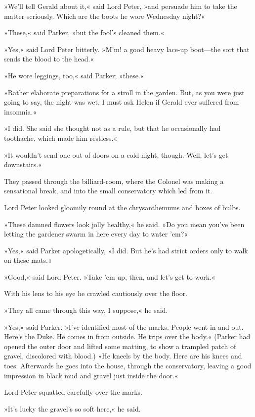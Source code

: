 »We'll tell Gerald about it,« said Lord Peter, »and persuade him to take the matter seriously. Which are the boots he wore Wednesday night?«

»These,« said Parker, »but the fool's cleaned them.«

»Yes,« said Lord Peter bitterly. »M'm! a good heavy lace-up boot\allowbreak---\allowbreak the sort that sends the blood to the head.«

»He wore leggings, too,« said Parker; »these.«

»Rather elaborate preparations for a stroll in the garden. But, as you were just going to say, the night was wet. I must ask Helen if Gerald ever suffered from insomnia.«

»I did. She said she thought not as a rule, but that he occasionally had toothache, which made him restless.«

»It wouldn't send one out of doors on a cold night, though. Well, let's get downstairs.«

They passed through the billiard-room, where the Colonel was making a sensational break, and into the small conservatory which led from it.

Lord Peter looked gloomily round at the chrysanthemums and boxes of bulbs.

»These damned flowers look jolly healthy,« he said. »Do you mean you've been letting the gardener swarm in here every day to water 'em?«

»Yes,« said Parker apologetically, »I did. But he's had strict orders only to walk on these mats.«

»Good,« said Lord Peter. »Take 'em up, then, and let's get to work.«

With his lens to his eye he crawled cautiously over the floor.

»They all came through this way, I suppose,« he said.

»Yes,« said Parker. »I've identified most of the marks. People went in and out. Here's the Duke. He comes in from outside. He trips over the body.« (Parker had opened the outer door and lifted some matting, to show a trampled patch of gravel, discolored with blood.) »He kneels by the body. Here are his knees and toes. Afterwards he goes into the house, through the conservatory, leaving a good impression in black mud and gravel just inside the door.«

Lord Peter squatted carefully over the marks.

»It's lucky the gravel's so soft here,« he said.

